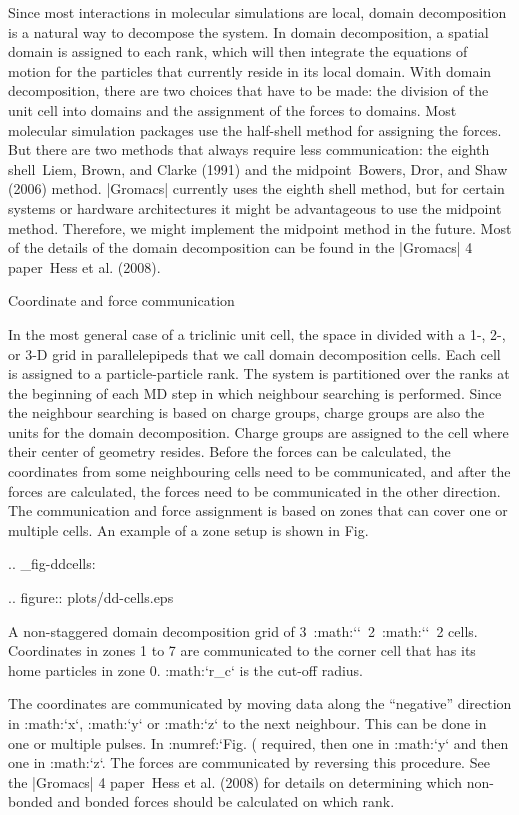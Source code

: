 Since most interactions in molecular simulations are local, domain
decomposition is a natural way to decompose the system. In domain
decomposition, a spatial domain is assigned to each rank, which will
then integrate the equations of motion for the particles that currently
reside in its local domain. With domain decomposition, there are two
choices that have to be made: the division of the unit cell into domains
and the assignment of the forces to domains. Most molecular simulation
packages use the half-shell method for assigning the forces. But there
are two methods that always require less communication: the eighth
shell Liem, Brown, and Clarke (1991) and the midpoint Bowers, Dror, and
Shaw (2006) method. |Gromacs| currently uses the eighth shell method, but
for certain systems or hardware architectures it might be advantageous
to use the midpoint method. Therefore, we might implement the midpoint
method in the future. Most of the details of the domain decomposition
can be found in the |Gromacs| 4 paper Hess et al. (2008).

Coordinate and force communication
~~~~~~~~~~~~~~~~~~~~~~~~~~~~~~~~~~

In the most general case of a triclinic unit cell, the space in divided
with a 1-, 2-, or 3-D grid in parallelepipeds that we call domain
decomposition cells. Each cell is assigned to a particle-particle rank.
The system is partitioned over the ranks at the beginning of each MD
step in which neighbour searching is performed. Since the neighbour
searching is based on charge groups, charge groups are also the units
for the domain decomposition. Charge groups are assigned to the cell
where their center of geometry resides. Before the forces can be
calculated, the coordinates from some neighbouring cells need to be
communicated, and after the forces are calculated, the forces need to be
communicated in the other direction. The communication and force
assignment is based on zones that can cover one or multiple cells. An
example of a zone setup is shown in Fig. 

.. _fig-ddcells:

.. figure:: plots/dd-cells.eps

   A non-staggered domain decomposition grid of
   3\ :math:`\times`\ 2\ :math:`\times`\ 2 cells. Coordinates in zones 1
   to 7 are communicated to the corner cell that has its home particles
   in zone 0. :math:`r_c` is the cut-off radius.

The coordinates are communicated by moving data along the “negative”
direction in :math:`x`, :math:`y` or :math:`z` to the next neighbour.
This can be done in one or multiple pulses. In
:numref:`Fig. (%
required, then one in :math:`y` and then one in :math:`z`. The forces
are communicated by reversing this procedure. See the |Gromacs| 4
paper Hess et al. (2008) for details on determining which non-bonded and
bonded forces should be calculated on which rank.

